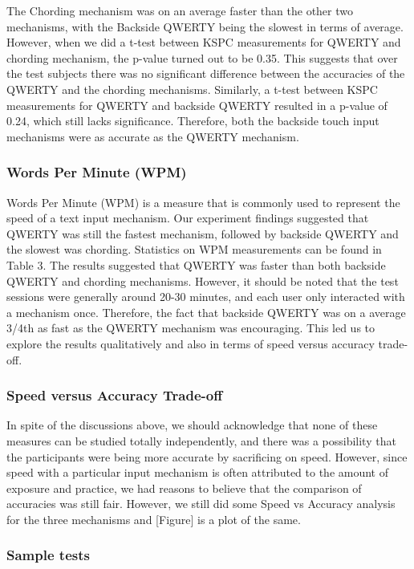 The Chording mechanism was on an average faster than the other two
mechanisms, with the Backside QWERTY being the slowest in terms of
average. However, when we did a t-test between KSPC measurements for
QWERTY and chording mechanism, the p-value turned out to be 0.35. This
suggests that over the test subjects there was no significant
difference between the accuracies of the QWERTY and the chording
mechanisms. Similarly, a t-test between KSPC measurements for QWERTY
and backside QWERTY resulted in a p-value of 0.24, which still lacks
significance. Therefore, both the backside touch input mechanisms were
as accurate as the QWERTY mechanism.

\subsubsection{Words Per Minute (WPM)}

Words Per Minute (WPM) is a measure that is commonly used to represent
the speed of a text input mechanism. Our experiment findings suggested
that QWERTY was still the fastest mechanism, followed by backside
QWERTY and the slowest was chording. Statistics on WPM measurements
can be found in Table 3.  The results suggested that QWERTY was faster
than both backside QWERTY and chording mechanisms. However, it should
be noted that the test sessions were generally around 20-30 minutes,
and each user only interacted with a mechanism once. Therefore, the
fact that backside QWERTY was on a average 3/4th as fast as the QWERTY
mechanism was encouraging. This led us to explore the results
qualitatively and also in terms of speed versus accuracy trade-off.

\subsubsection{Speed versus Accuracy Trade-off}

In spite of the discussions above, we should acknowledge that none of
these measures can be studied totally independently, and there was a
possibility that the participants were being more accurate by
sacrificing on speed. However, since speed with a particular input
mechanism is often attributed to the amount of exposure and practice,
we had reasons to believe that the comparison of accuracies was still
fair. However, we still did some Speed vs Accuracy analysis for the
three mechanisms and [Figure] is a plot of the same.

\subsubsection{Sample tests}

